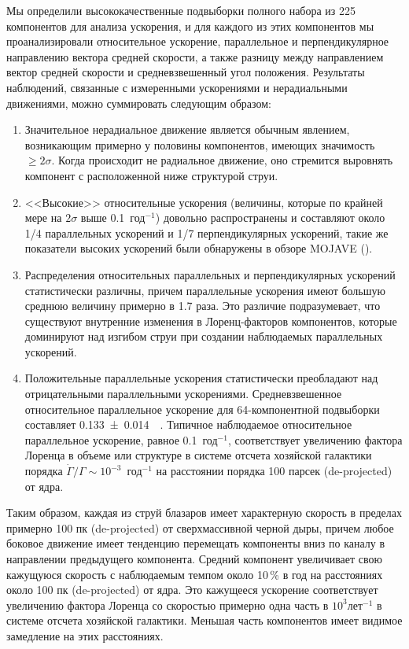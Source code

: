 Мы определили высококачественные подвыборки полного набора из 225 компонентов для анализа ускорения,
и для каждого из этих компонентов мы проанализировали относительное ускорение, параллельное и
перпендикулярное направлению вектора средней скорости, а также разницу между направлением вектор
средней скорости и средневзвешенный угол положения. Результаты наблюдений, связанные с измеренными
ускорениями и нерадиальными движениями, можно суммировать следующим образом:
\begin{enumerate}
 \item
 Значительное нерадиальное движение является обычным явлением, возникающим примерно у половины
компонентов, имеющих значимость $\ge2\sigma$. Когда происходит не радиальное движение, оно
стремится выровнять компонент с расположенной ниже структурой струи.

\item
<<Высокие>> относительные ускорения (величины, которые по крайней мере на $2\sigma$ выше
0.1~год$^{-1}$) довольно распространены и составляют около 1/4 параллельных ускорений и 1/7
перпендикулярных ускорений, такие же показатели высоких ускорений были обнаружены в обзоре MOJAVE
(\cite{Homan_2009}).

\item
Распределения относительных параллельных и перпендикулярных ускорений статистически различны, причем
параллельные ускорения имеют большую среднюю величину примерно в 1.7 раза. Это различие
подразумевает, что существуют внутренние изменения в Лоренц-факторов компонентов, которые
доминируют над изгибом струи при создании наблюдаемых параллельных ускорений.

\item
Положительные параллельные ускорения статистически преобладают над отрицательными параллельными
ускорениями. Средневзвешенное относительное параллельное ускорение для 64-компонентной подвыборки
составляет \SI{0.133+-0.014}{\per\year}. Типичное наблюдаемое относительное параллельное
ускорение, равное 0.1~год$^{-1}$, соответствует увеличению фактора Лоренца в объеме или
структуре в системе отсчета хозяйской галактики порядка $\dot{\Gamma} / \Gamma
\sim10^{-3}$~год$^{-1}$ на расстоянии порядка 100 парсек (de-projected) от ядра.

\end{enumerate}

Таким образом, каждая из струй блазаров имеет характерную скорость в пределах примерно 100 пк
(de-projected) от сверхмассивной черной дыры, причем любое боковое движение имеет тенденцию
перемещать компоненты вниз по каналу в направлении предыдущего компонента. Средний компонент
увеличивает свою кажущуюся скорость с наблюдаемым темпом около 10\,\% в год на расстояниях около
100 пк (de-projected) от ядра. Это кажущееся ускорение соответствует увеличению фактора Лоренца
со скоростью примерно одна часть в $10^3$лет$^{-1}$ в системе отсчета хозяйской галактики. Меньшая
часть компонентов имеет видимое замедление на этих расстояниях.

